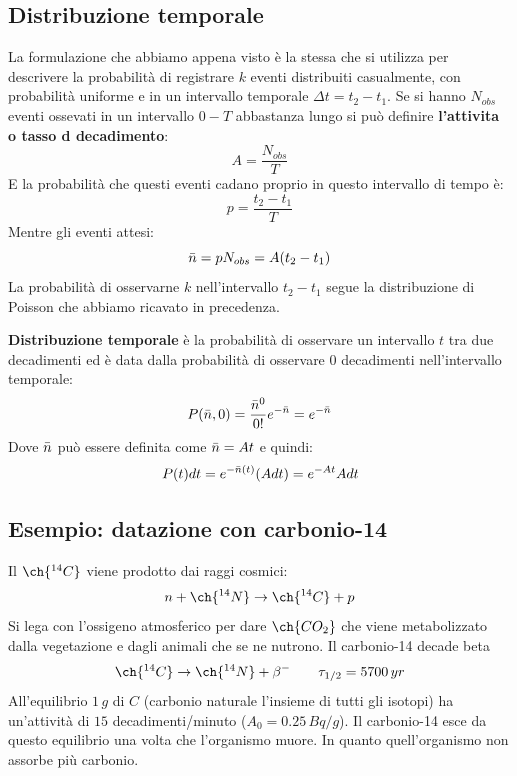 \subsection{Distribuzione temporale}
La formulazione che abbiamo appena visto è la stessa che si utilizza per descrivere la probabilità di registrare $k$ eventi distribuiti casualmente, con probabilità uniforme e in un intervallo temporale $\Delta t=t_2-t_1$. Se si hanno $N_{obs}$ eventi ossevati in un intervallo $0-T$ abbastanza lungo si può definire \textbf{l'attivita o tasso d decadimento}:
\begin{equation*}
    A=\frac{N_{obs}}{T}
\end{equation*}
E la probabilità che questi eventi cadano proprio in questo intervallo di tempo è:
\begin{equation*}
    p=\frac{t_2-t_1}{T}
\end{equation*}
Mentre gli eventi attesi:
\begin{equation*}
    \Bar{n}=pN_{obs}=A(t_2-t_1)
\end{equation*}
La probabilità di osservarne $k$ nell'intervallo $t_2-t_1$ segue la distribuzione di Poisson che abbiamo ricavato in precedenza. 

\textbf{Distribuzione temporale} è la probabilità di osservare un intervallo $t$ tra due decadimenti ed è data dalla probabilità di osservare $0$ decadimenti nell'intervallo temporale:
\begin{equation*}
    P(\Bar{n},0)=\frac{\Bar{n}^0}{0!}e^{-\Bar{n}}=e^{-\Bar{n}}
\end{equation*}
Dove $\Bar{n}$ può essere definita come $\Bar{n}=At$ e quindi:
\begin{equation*}
    P(t)dt=e^{-\Bar{n}(t)}(Adt)=e^{-At}Adt
\end{equation*}
\subsection{Esempio: datazione con carbonio-14}
Il $\ch{^{14}C}$ viene prodotto dai raggi cosmici: 
\begin{equation*}
    n+\ch{^{14}N}\to\ch{^{14}C}+p
\end{equation*}
Si lega con l'ossigeno atmosferico per dare $\ch{CO_2}$ che viene metabolizzato dalla vegetazione e dagli animali che se ne nutrono. Il carbonio-14 decade beta
\begin{equation*}
    \ch{^{14}C}\to\ch{^{14}N}+\beta^- \qquad \tau_{1/2}=5700\,yr
\end{equation*}
All'equilibrio $1\,g$ di $C$ (carbonio naturale l'insieme di tutti gli isotopi) ha un'attività di $15$ decadimenti/minuto ($A_0=0.25\,Bq/g$). Il carbonio-14 esce da questo equilibrio una volta che l'organismo muore. In quanto quell'organismo non assorbe più carbonio. 

